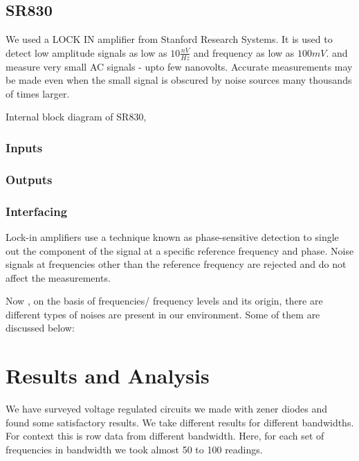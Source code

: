 \documentclass[12pt]{article}
\begin{document}
\subsection{SR830}

We used a LOCK IN amplifier from Stanford Research Systems. It is used to detect low amplitude signals as low as $10\frac{nV}{Hz}$ and frequency as low as $100mV$.  and measure very small AC signals - upto few nanovolts. Accurate measurements may be made even when the small signal is obscured by noise sources many thousands of times larger.


Internal block diagram of SR830,

\begin{figure}[hbt!]
\end{figure}

\subsubsection{Inputs}

\subsubsection{Outputs}

\subsubsection{Interfacing}



Lock-in amplifiers use a technique known as
phase-sensitive detection to single out the component of the signal at a specific reference frequency and phase. Noise signals at frequencies other than the reference frequency are rejected and do not affect the measurements.


Now , on the basis of frequencies/ frequency levels and its origin, there are different types of noises are present in our environment. Some of them are discussed below:



\clearpage
\section{Results and Analysis}

We have surveyed voltage regulated circuits we made with zener diodes and found some satisfactory results. We take different results for different bandwidths. For context this is row data from different bandwidth. Here, for each set of frequencies in bandwidth we took almost 50 to 100 readings.
\end{document}
